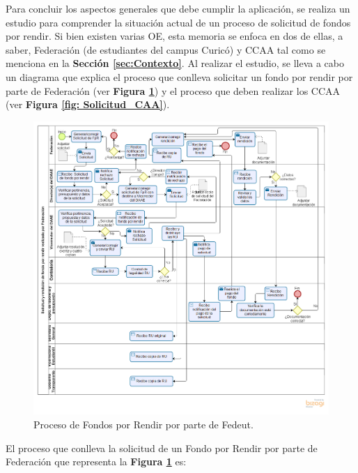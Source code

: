 Para concluir los aspectos generales que debe cumplir la aplicación, se realiza un estudio para comprender la situación actual de un proceso de solicitud de fondos por rendir. Si bien existen varias OE, esta memoria se enfoca en dos de ellas, a saber, Federación (de estudiantes del campus Curicó) y CCAA tal como se menciona en la \textbf{Sección \ref{sec:Contexto}}. Al realizar el estudio, se lleva a cabo un diagrama que explica el proceso que conlleva solicitar un fondo por rendir por parte de Federación (ver \textbf{Figura \ref{fig: Solicitud_Federacion}}) y el proceso que deben realizar los CCAA (ver \textbf{Figura \ref{fig: Solicitud_CAA}}).

\begin{figure}[tb!]
    \hspace{-9mm}
    \includegraphics[width=1.1\textwidth]{Imagenes/Solicitud_Federacion_Rendicion.png}
    \caption{\label{fig: Solicitud_Federacion}Proceso de Fondos por Rendir por parte de Fedeut.}
\end{figure}

El proceso que conlleva la solicitud de un Fondo por Rendir por parte de Federación que representa la \textbf{Figura \ref{fig: Solicitud_Federacion}} es:


